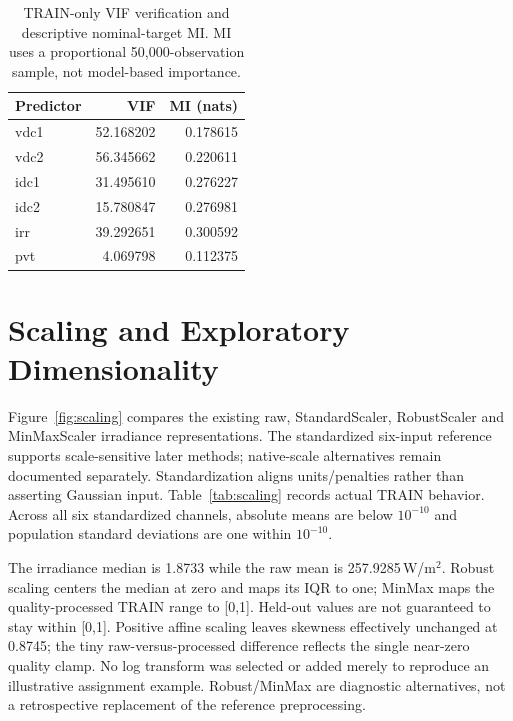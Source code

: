 \documentclass[conference]{IEEEtran}
\begin{document}
\begin{table}[!t]
\caption{TRAIN-only VIF verification and descriptive nominal-target MI. MI uses a proportional 50,000-observation sample, not model-based importance.}\label{tab:association}
\centering\footnotesize
\begin{tabularx}{\columnwidth}{Yrr}
\toprule
Predictor & VIF & MI (nats) \\ \midrule
vdc1 & 52.168202 & 0.178615 \\
vdc2 & 56.345662 & 0.220611 \\
idc1 & 31.495610 & 0.276227 \\
idc2 & 15.780847 & 0.276981 \\
irr & 39.292651 & 0.300592 \\
pvt & 4.069798 & 0.112375 \\
\bottomrule
\end{tabularx}
\end{table}

\section{Scaling and Exploratory Dimensionality}
Figure~\ref{fig:scaling} compares the existing raw, StandardScaler, RobustScaler and MinMaxScaler irradiance representations. The standardized six-input reference supports scale-sensitive later methods; native-scale alternatives remain documented separately. Standardization aligns units/penalties rather than asserting Gaussian input. Table~\ref{tab:scaling} records actual TRAIN behavior. Across all six standardized channels, absolute means are below $10^{-10}$ and population standard deviations are one within $10^{-10}$.

The irradiance median is 1.8733 while the raw mean is 257.9285\,W/m$^2$. Robust scaling centers the median at zero and maps its IQR to one; MinMax maps the quality-processed TRAIN range to [0,1]. Held-out values are not guaranteed to stay within [0,1]. Positive affine scaling leaves skewness effectively unchanged at 0.8745; the tiny raw-versus-processed difference reflects the single near-zero quality clamp. No log transform was selected or added merely to reproduce an illustrative assignment example. Robust/MinMax are diagnostic alternatives, not a retrospective replacement of the reference preprocessing.
\end{document}
